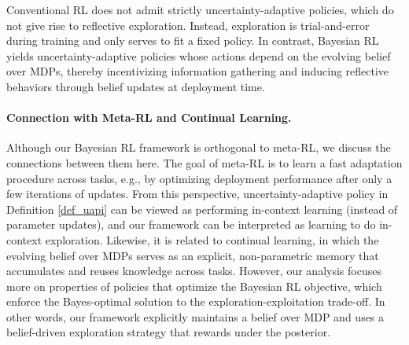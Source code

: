 \begin{AIbox}{}
Conventional RL does not admit strictly uncertainty-adaptive policies, which do not give rise to reflective exploration. Instead, exploration is trial-and-error during training and only serves to fit a fixed policy. In contrast, Bayesian RL yields uncertainty-adaptive policies whose actions depend on the evolving belief over MDPs, thereby incentivizing information gathering and inducing reflective behaviors through belief updates at deployment time.
\end{AIbox}

\vspace{-0.15cm}
\paragraph{Connection with Meta-RL and Continual Learning.} Although our Bayesian RL framework is orthogonal to meta-RL, we discuss the connections between them here. The goal of meta-RL is to learn a fast adaptation procedure across tasks, e.g., by optimizing deployment performance after only a few iterations of updates. From this perspective, uncertainty-adaptive policy in Definition \ref{def_uapi} can be viewed as performing in-context learning (instead of parameter updates), and our framework can be interpreted as learning to do in-context exploration. Likewise, it is related to continual learning, in which the evolving belief over MDPs serves as an explicit, non-parametric memory that accumulates and reuses knowledge across tasks. However, our analysis focuses more on properties of policies that optimize the Bayesian RL objective, which enforce the Bayes-optimal solution to the exploration-exploitation trade-off. In other words, our framework explicitly maintains a belief over MDP and uses a belief-driven exploration strategy that rewards under the posterior.